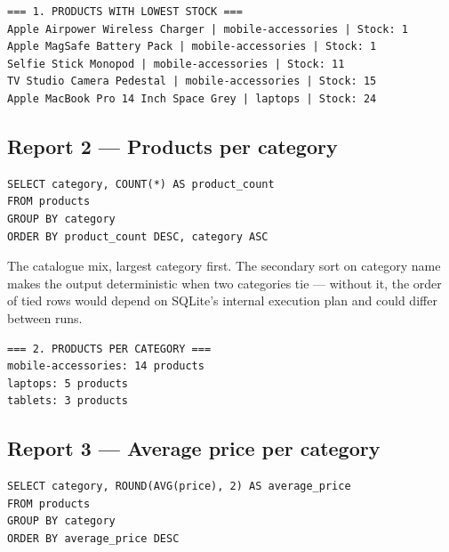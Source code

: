 \begin{codebox}
\noindent
\begin{lstlisting}[style=txt]
=== 1. PRODUCTS WITH LOWEST STOCK ===
Apple Airpower Wireless Charger | mobile-accessories | Stock: 1
Apple MagSafe Battery Pack | mobile-accessories | Stock: 1
Selfie Stick Monopod | mobile-accessories | Stock: 11
TV Studio Camera Pedestal | mobile-accessories | Stock: 15
Apple MacBook Pro 14 Inch Space Grey | laptops | Stock: 24
\end{lstlisting}
\end{codebox}

\subsection{Report 2 --- Products per category}

\begin{codebox}
\noindent
\begin{lstlisting}[style=py]
SELECT category, COUNT(*) AS product_count
FROM products
GROUP BY category
ORDER BY product_count DESC, category ASC
\end{lstlisting}
\end{codebox}

The catalogue mix, largest category first. The secondary sort on category
name makes the output deterministic when two categories tie --- without it,
the order of tied rows would depend on SQLite's internal execution plan and
could differ between runs.

\begin{codebox}
\noindent
\begin{lstlisting}[style=txt]
=== 2. PRODUCTS PER CATEGORY ===
mobile-accessories: 14 products
laptops: 5 products
tablets: 3 products
\end{lstlisting}
\end{codebox}

\subsection{Report 3 --- Average price per category}

\begin{codebox}
\noindent
\begin{lstlisting}[style=py]
SELECT category, ROUND(AVG(price), 2) AS average_price
FROM products
GROUP BY category
ORDER BY average_price DESC
\end{lstlisting}
\end{codebox}

